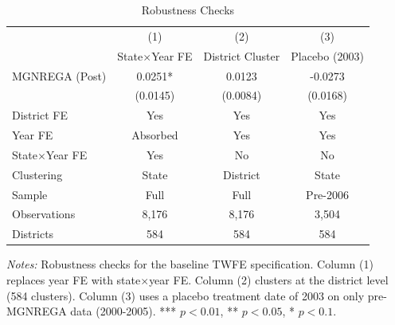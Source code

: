 \begin{table}[htbp]
\centering
\caption{Robustness Checks}
\label{tab:robustness}
\begin{tabular}{lccc}
\hline\hline
 & (1) & (2) & (3) \\
 & State$\times$Year FE & District Cluster & Placebo (2003) \\
\hline
MGNREGA (Post) & 0.0251* & 0.0123 & -0.0273 \\
 & (0.0145) & (0.0084) & (0.0168) \\
\hline
District FE & Yes & Yes & Yes \\
Year FE & Absorbed & Yes & Yes \\
State$\times$Year FE & Yes & No & No \\
Clustering & State & District & State \\
Sample & Full & Full & Pre-2006 \\
Observations & 8,176 & 8,176 & 3,504 \\
Districts & 584 & 584 & 584 \\
\hline\hline
\end{tabular}
\begin{tablenotes}[flushleft]\small
\item \textit{Notes:} Robustness checks for the baseline TWFE specification. Column (1) replaces year FE with state$\times$year FE. Column (2) clusters at the district level (584 clusters). Column (3) uses a placebo treatment date of 2003 on only pre-MGNREGA data (2000-2005). *** $p<0.01$, ** $p<0.05$, * $p<0.1$.
\end{tablenotes}
\end{table}

